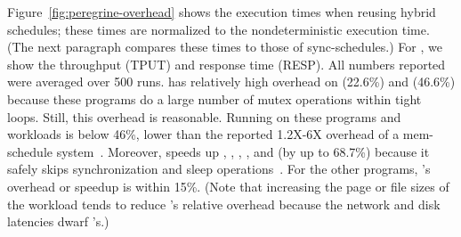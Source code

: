 Figure~\ref{fig:peregrine-overhead} shows the execution times when reusing hybrid
schedules; these times are normalized to the nondeterministic
execution time.  (The next paragraph compares these times to those of
sync-schedules.)  For \apache, we show the throughput (TPUT) and response
time (RESP).  All numbers reported were averaged over 500 runs.  \peregrine
has relatively high overhead on \watern (22.6\%) and \cholesky (46.6\%)
because these programs do a large number of mutex operations within tight 
loops. Still, this overhead is reasonable. Running \peregrine on these 
programs and workloads is below 46\%,
lower than the reported 1.2X-6X overhead of a mem-schedule \dmt
system~\cite{coredet:asplos10}.  Moreover, \peregrine speeds up \barnes, \lun,
\radix, \waters, and \ocean (by up to 68.7\%) because it safely skips
synchronization and sleep operations~\cite{cui:tern:osdi10}.  For the other
programs, \peregrine's overhead or speedup is within 15\%.  (Note that
increasing the page or file sizes of the workload
tends to reduce \peregrine's relative overhead
because the network and disk latencies dwarf \peregrine's.)

